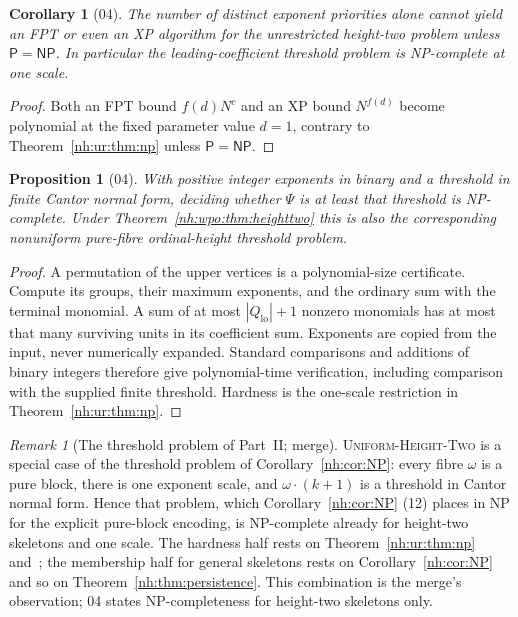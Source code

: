 \documentclass[11pt,a4paper]{article}
\newtheorem{proposition}[theorem]{Proposition}
\newtheorem{corollary}[theorem]{Corollary}
\theoremstyle{definition}
\theoremstyle{remark}
\newtheorem{remark}[theorem]{Remark}
\newcommand{\Qlo}{Q_{\mathrm{lo}}}
\begin{document}
\begin{corollary}[04]\label{nh:ur:cor:priorityhard}
The number of distinct exponent priorities alone cannot yield an FPT or even
an XP algorithm for the unrestricted height-two problem unless
$\mathsf P=\mathsf{NP}$. In particular the leading-coefficient threshold
problem is NP-complete at one scale.
\end{corollary}
\begin{proof}
Both an FPT bound $f(d)N^c$ and an XP bound $N^{f(d)}$ become polynomial at the
fixed parameter value $d=1$, contrary to Theorem~\ref{nh:ur:thm:np} unless
$\mathsf P=\mathsf{NP}$.
\end{proof}

\begin{proposition}[04]\label{nh:ur:prop:weightednp}
With positive integer exponents in binary and a threshold in finite Cantor
normal form, deciding whether $\Psi$ is at least that threshold is
NP-complete. Under Theorem~\ref{nh:wpo:thm:heighttwo} this is also the
corresponding nonuniform pure-fibre ordinal-height threshold problem.
\end{proposition}
\begin{proof}
A permutation of the upper vertices is a polynomial-size certificate. Compute
its groups, their maximum exponents, and the ordinary sum with the terminal
monomial. A sum of at most $|\Qlo|+1$ nonzero monomials has at most that many
surviving units in its coefficient sum. Exponents are copied from the input,
never numerically expanded. Standard comparisons and additions of binary
integers therefore give polynomial-time verification, including comparison
with the supplied finite threshold. Hardness is the one-scale restriction in
Theorem~\ref{nh:ur:thm:np}.
\end{proof}

\begin{remark}[The threshold problem of Part~II; merge]\label{nh:ur:rem:partII}
\textsc{Uniform-Height-Two} is a special case of the threshold problem of
Corollary~\ref{nh:cor:NP}: every fibre $\omega$ is a pure block, there is one
exponent scale, and $\omega\cdot(k+1)$ is a threshold in Cantor normal form.
Hence that problem, which Corollary~\ref{nh:cor:NP} (12) places in
$\mathrm{NP}$ for the explicit pure-block encoding, is NP-complete already for
height-two skeletons and one scale. The hardness half rests on
Theorem~\ref{nh:ur:thm:np} and~\cite{GHL2001}; the membership half for general
skeletons rests on Corollary~\ref{nh:cor:NP} and so on
Theorem~\ref{nh:thm:persistence}. This combination is the merge's
observation; 04 states NP-completeness for height-two skeletons only.
\end{remark}
\end{document}
